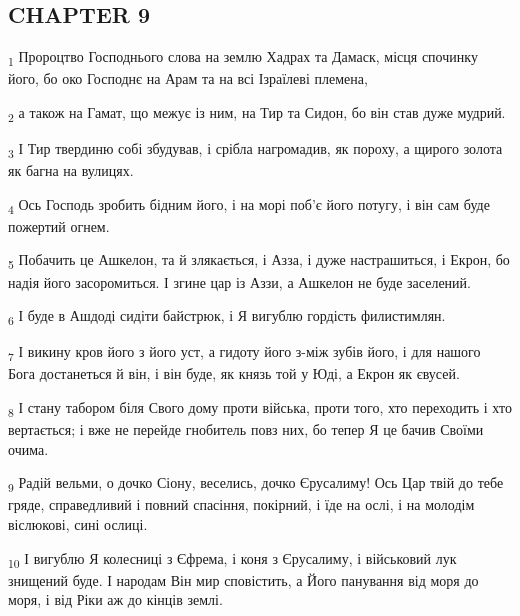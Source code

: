 \subsection{CHAPTER 9}
\begin{tcolorbox}
\textsubscript{1} Пророцтво Господнього слова на землю Хадрах та Дамаск, місця спочинку його, бо око Господнє на Арам та на всі Ізраїлеві племена,
\end{tcolorbox}
\begin{tcolorbox}
\textsubscript{2} а також на Гамат, що межує із ним, на Тир та Сидон, бо він став дуже мудрий.
\end{tcolorbox}
\begin{tcolorbox}
\textsubscript{3} І Тир твердиню собі збудував, і срібла нагромадив, як пороху, а щирого золота як багна на вулицях.
\end{tcolorbox}
\begin{tcolorbox}
\textsubscript{4} Ось Господь зробить бідним його, і на морі поб'є його потугу, і він сам буде пожертий огнем.
\end{tcolorbox}
\begin{tcolorbox}
\textsubscript{5} Побачить це Ашкелон, та й злякається, і Азза, і дуже настрашиться, і Екрон, бо надія його засоромиться. І згине цар із Аззи, а Ашкелон не буде заселений.
\end{tcolorbox}
\begin{tcolorbox}
\textsubscript{6} І буде в Ашдоді сидіти байстрюк, і Я вигублю гордість филистимлян.
\end{tcolorbox}
\begin{tcolorbox}
\textsubscript{7} І викину кров його з його уст, а гидоту його з-між зубів його, і для нашого Бога достанеться й він, і він буде, як князь той у Юді, а Екрон як євусей.
\end{tcolorbox}
\begin{tcolorbox}
\textsubscript{8} І стану табором біля Свого дому проти війська, проти того, хто переходить і хто вертається; і вже не перейде гнобитель повз них, бо тепер Я це бачив Своїми очима.
\end{tcolorbox}
\begin{tcolorbox}
\textsubscript{9} Радій вельми, о дочко Сіону, веселись, дочко Єрусалиму! Ось Цар твій до тебе гряде, справедливий і повний спасіння, покірний, і їде на ослі, і на молодім віслюкові, сині ослиці.
\end{tcolorbox}
\begin{tcolorbox}
\textsubscript{10} І вигублю Я колесниці з Єфрема, і коня з Єрусалиму, і військовий лук знищений буде. І народам Він мир сповістить, а Його панування від моря до моря, і від Ріки аж до кінців землі.
\end{tcolorbox}
